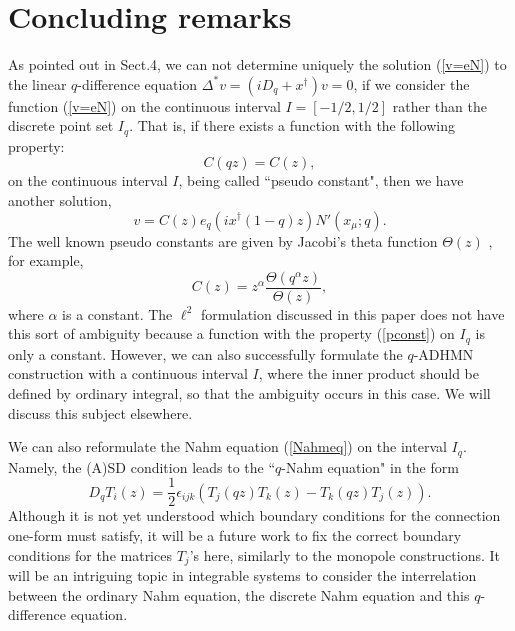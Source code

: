 \documentclass[a4paper,10pt]{article}
\begin{document}
\section{Concluding remarks}
As pointed out in Sect.4, we can not determine uniquely the solution (\ref{v=eN}) to the linear $q$-difference equation $\Delta^*v=(iD_q+x^\dagger )v=0$, if we consider the function (\ref{v=eN}) on the continuous interval $I=[-1/2,1/2]$ rather than the discrete point set $I_q$. 
That is, if there exists a function with the following property:
\begin{equation}
C(qz)=C(z), \label{pconst}
\end{equation}
on the continuous interval $I$, being called ``pseudo constant", then we have another solution,   
\begin{equation}
v=C(z)e_q(ix^\dagger (1-q)z)N'(x_\mu;q).\label{v=CeN} 
\end{equation}
The well known pseudo constants are given by Jacobi's theta function $\Theta(z)$ \cite{FR}, for example,
\begin{equation}
C(z)=z^{\alpha}\frac{\Theta(q^{\alpha}z)}{\Theta(z)}, \label{Jtheta} 
\end{equation}
where $\alpha$ is a constant.
The $\ell^2$ formulation discussed in this paper does not have this sort of ambiguity because a function with the property (\ref{pconst}) on $I_q$ is only a constant.
However, we can also successfully formulate the $q$-ADHMN construction with a continuous interval $I$, where the inner product should be defined by ordinary integral, so that the ambiguity occurs in this case.
We will discuss this subject elsewhere.


We can also reformulate the Nahm equation (\ref{Nahmeq}) on the interval $I_q$.
Namely, the (A)SD condition leads to the ``$q$-Nahm equation" in the form   
\begin{equation}
D_qT_i(z)=\frac{1}{2}\epsilon_{ijk}(T_j(qz)T_k(z)-T_k(qz)T_j(z)).
\end{equation}
Although it is not yet understood which boundary conditions for the connection one-form must satisfy, it will be a future work to fix the correct boundary conditions for the matrices $T_j$'s here, similarly to the monopole constructions.
It will be an intriguing topic in integrable systems to consider the interrelation between the ordinary Nahm equation, the discrete Nahm equation and this $q$-difference equation.
\end{document}
